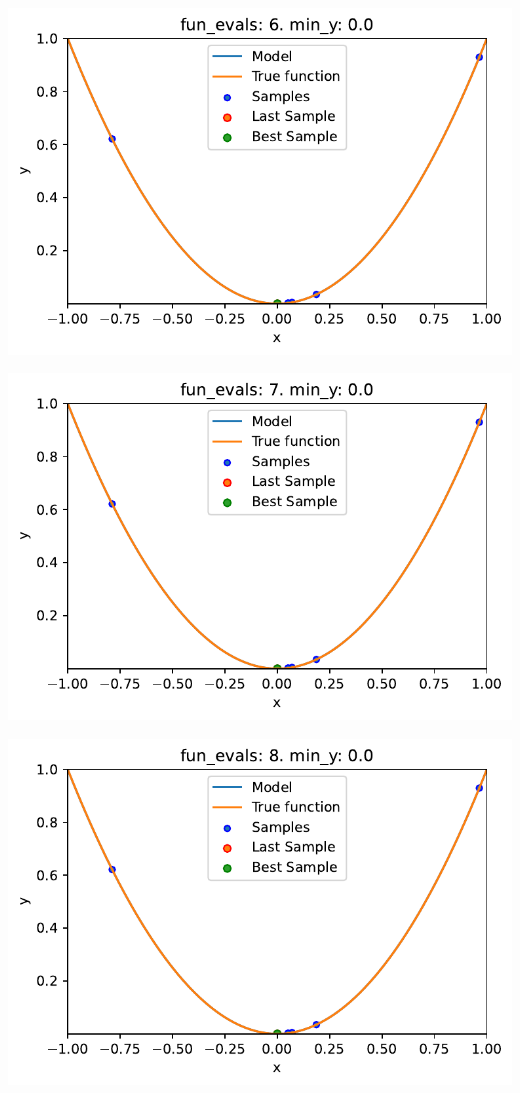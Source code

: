 \documentclass[
  letterpaper,
  DIV=11,
  numbers=noendperiod]{scrreprt}
\begin{document}
\includegraphics{010_num_spot_sklearn_surrogate_files/figure-pdf/cell-24-output-5.pdf}

\includegraphics{010_num_spot_sklearn_surrogate_files/figure-pdf/cell-24-output-6.pdf}

\includegraphics{010_num_spot_sklearn_surrogate_files/figure-pdf/cell-24-output-7.pdf}
\end{document}
